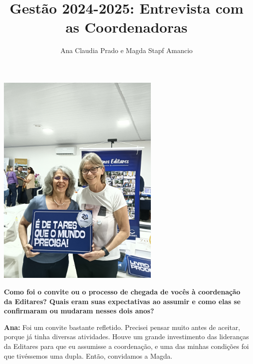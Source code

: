 \documentclass{gescons}
\author{Ana Claudia Prado e Magda Stapf Amancio}
\title{Gestão 2024-2025: Entrevista com as Coordenadoras}
\begin{document}
    \makeentrevistatitle



    \begin{multicols}{2}


    \begin{center}
        \includegraphics[width=8cm,trim={100 0 100 1100},clip]{articles/resumo/fotos/materia2/IMG20241208144410.jpg}
    \end{center}



\textbf{Como foi o convite ou o processo de chegada de vocês à coordenação da Editares? Quais eram suas expectativas ao assumir e como elas se confirmaram ou mudaram nesses dois anos?}

\textbf{Ana:} Foi um convite bastante refletido. Precisei pensar muito antes de aceitar, porque já tinha diversas atividades. Houve um grande investimento das lideranças da Editares para que eu assumisse a coordenação, e uma das minhas condições foi que tivéssemos uma dupla. Então, convidamos a Magda.


\end{multicols}
\end{document}
